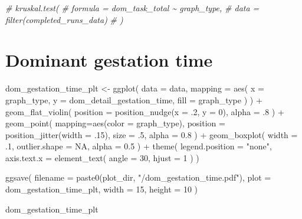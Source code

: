 \documentclass[
]{book}
\newenvironment{Shaded}{\begin{snugshade}}{\end{snugshade}}
\newcommand{\AttributeTok}[1]{\textcolor[rgb]{0.77,0.63,0.00}{#1}}
\newcommand{\CommentTok}[1]{\textcolor[rgb]{0.56,0.35,0.01}{\textit{#1}}}
\newcommand{\ConstantTok}[1]{\textcolor[rgb]{0.00,0.00,0.00}{#1}}
\newcommand{\DecValTok}[1]{\textcolor[rgb]{0.00,0.00,0.81}{#1}}
\newcommand{\FloatTok}[1]{\textcolor[rgb]{0.00,0.00,0.81}{#1}}
\newcommand{\FunctionTok}[1]{\textcolor[rgb]{0.00,0.00,0.00}{#1}}
\newcommand{\NormalTok}[1]{#1}
\newcommand{\OtherTok}[1]{\textcolor[rgb]{0.56,0.35,0.01}{#1}}
\newcommand{\SpecialCharTok}[1]{\textcolor[rgb]{0.00,0.00,0.00}{#1}}
\newcommand{\StringTok}[1]{\textcolor[rgb]{0.31,0.60,0.02}{#1}}
\begin{document}
\begin{Shaded}
\begin{Highlighting}[]
\CommentTok{\# kruskal.test(}
\CommentTok{\#   formula = dom\_task\_total \textasciitilde{} graph\_type,}
\CommentTok{\#   data = filter(completed\_runs\_data)}
\CommentTok{\# )}
\end{Highlighting}
\end{Shaded}

\hypertarget{dominant-gestation-time}{%
\section{Dominant gestation time}\label{dominant-gestation-time}}

\begin{Shaded}
\begin{Highlighting}[]
\NormalTok{dom\_gestation\_time\_plt }\OtherTok{\textless{}{-}} \FunctionTok{ggplot}\NormalTok{(}
    \AttributeTok{data =}\NormalTok{ data,}
    \AttributeTok{mapping =} \FunctionTok{aes}\NormalTok{(}
      \AttributeTok{x =}\NormalTok{ graph\_type,}
      \AttributeTok{y =}\NormalTok{ dom\_detail\_gestation\_time,}
      \AttributeTok{fill =}\NormalTok{ graph\_type}
\NormalTok{    )}
\NormalTok{  ) }\SpecialCharTok{+}
  \FunctionTok{geom\_flat\_violin}\NormalTok{(}
    \AttributeTok{position =} \FunctionTok{position\_nudge}\NormalTok{(}\AttributeTok{x =}\NormalTok{ .}\DecValTok{2}\NormalTok{, }\AttributeTok{y =} \DecValTok{0}\NormalTok{),}
    \AttributeTok{alpha =}\NormalTok{ .}\DecValTok{8}
\NormalTok{  ) }\SpecialCharTok{+}
  \FunctionTok{geom\_point}\NormalTok{(}
    \AttributeTok{mapping=}\FunctionTok{aes}\NormalTok{(}\AttributeTok{color =}\NormalTok{ graph\_type),}
    \AttributeTok{position =} \FunctionTok{position\_jitter}\NormalTok{(}\AttributeTok{width =}\NormalTok{ .}\DecValTok{15}\NormalTok{),}
    \AttributeTok{size =}\NormalTok{ .}\DecValTok{5}\NormalTok{,}
    \AttributeTok{alpha =} \FloatTok{0.8}
\NormalTok{  ) }\SpecialCharTok{+}
  \FunctionTok{geom\_boxplot}\NormalTok{(}
    \AttributeTok{width =}\NormalTok{ .}\DecValTok{1}\NormalTok{,}
    \AttributeTok{outlier.shape =} \ConstantTok{NA}\NormalTok{,}
    \AttributeTok{alpha =} \FloatTok{0.5}
\NormalTok{  ) }\SpecialCharTok{+}
  \FunctionTok{theme}\NormalTok{(}
    \AttributeTok{legend.position =} \StringTok{"none"}\NormalTok{,}
    \AttributeTok{axis.text.x =} \FunctionTok{element\_text}\NormalTok{(}
      \AttributeTok{angle =} \DecValTok{30}\NormalTok{,}
      \AttributeTok{hjust =} \DecValTok{1}
\NormalTok{    )}
\NormalTok{  )}

\FunctionTok{ggsave}\NormalTok{(}
  \AttributeTok{filename =} \FunctionTok{paste0}\NormalTok{(plot\_dir, }\StringTok{"/dom\_gestation\_time.pdf"}\NormalTok{),}
  \AttributeTok{plot =}\NormalTok{ dom\_gestation\_time\_plt,}
  \AttributeTok{width =} \DecValTok{15}\NormalTok{,}
  \AttributeTok{height =} \DecValTok{10}
\NormalTok{)}

\NormalTok{dom\_gestation\_time\_plt}
\end{Highlighting}
\end{Shaded}
\end{document}
